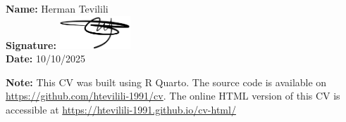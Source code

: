 \documentclass[
  letterpaper,
  DIV=11,
  numbers=noendperiod]{scrartcl}
\begin{document}
\textbf{Name:} Herman Tevilili\\
\textbf{Signature:}
\includegraphics[width=1.04167in,height=\textheight,keepaspectratio]{signature.png}\\
\textbf{Date:} 10/10/2025

\textbf{Note:} This CV was built using R Quarto. The source code is
available on \url{https://github.com/htevilili-1991/cv}. The online HTML
version of this CV is accessible at
\url{https://htevilili-1991.github.io/cv-html/}
\end{document}
